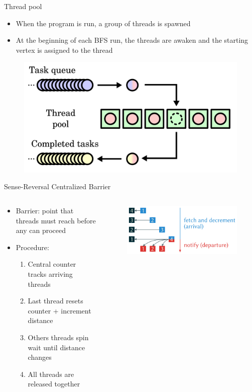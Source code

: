 \begin{frame}{Thread pool}
\begin{itemize}
  \item When the program is run, a group of threads is spawned
  \item At the beginning of each BFS run, the threads are awaken and the starting vertex is assigned to the  thread
\end{itemize}
\begin{figure}
  \centering
  \includegraphics[width=0.5\linewidth]{images/Thread_pool.png}
\end{figure}
\end{frame}
\begin{frame}{Sense-Reversal Centralized Barrier}
  \begin{columns}[c] %
    \begin{column}{0.5\textwidth}
      \begin{itemize}
        \item Barrier: point that threads must reach before any can proceed
        \item Procedure:
        \begin{enumerate}
          \item Central counter tracks arriving threads
          \item Last thread resets counter + increment distance
          \item Others threads spin wait until distance changes
          \item All threads are released together
        \end{enumerate}
      \end{itemize}
    \end{column}

    \begin{column}{0.5\textwidth}
      \begin{figure}
        \centering
        \includegraphics[width=\linewidth]{images/barrier.png}
      \end{figure}
    \end{column}
  \end{columns}
\end{frame}